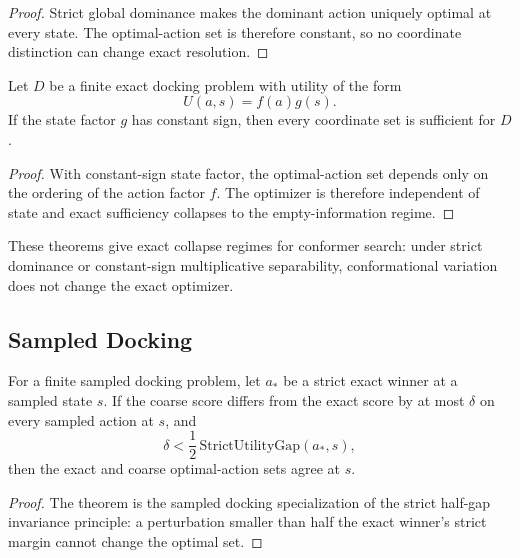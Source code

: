 \begin{proof}
Strict global dominance makes the dominant action uniquely optimal at every state. The optimal-action set is therefore constant, so no coordinate distinction can change exact resolution.
\end{proof}

\begin{theorem}\label{thm:multiplicative-separable-empty-sufficient}
Let $D$ be a finite exact docking problem with utility of the form
\[
U(a,s)=f(a)g(s).
\]
If the state factor $g$ has constant sign, then every coordinate set is sufficient for $D$.
\end{theorem}

\begin{proof}
With constant-sign state factor, the optimal-action set depends only on the ordering of the action factor $f$. The optimizer is therefore independent of state and exact sufficiency collapses to the empty-information regime.
\end{proof}

These theorems give exact collapse regimes for conformer search: under strict dominance or constant-sign multiplicative separability, conformational variation does not change the exact optimizer.

\subsection{Sampled Docking}

\begin{theorem}\label{thm:sampled-docking-gap}
For a finite sampled docking problem, let $a_\ast$ be a strict exact winner at a sampled state $s$. If the coarse score differs from the exact score by at most $\delta$ on every sampled action at $s$, and
\[
\delta < \frac{1}{2}\,\mathrm{StrictUtilityGap}(a_\ast,s),
\]
then the exact and coarse optimal-action sets agree at $s$.
\end{theorem}

\begin{proof}
The theorem is the sampled docking specialization of the strict half-gap invariance principle: a perturbation smaller than half the exact winner's strict margin cannot change the optimal set.
\end{proof}

